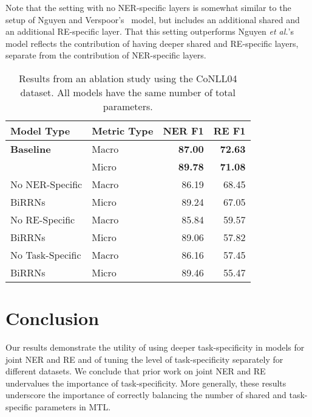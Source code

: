 \documentclass{article}
\begin{document}
Note that the setting with no NER-specific layers is somewhat similar to the setup of Nguyen and Verspoor's~ model, but includes an additional shared and an additional RE-specific layer. That this setting outperforms Nguyen {\em et al.}'s model reflects the contribution of having deeper shared and RE-specific layers, separate from the contribution of NER-specific layers.

\begin{table}[t]
\centering
\begin{tabular}{@{}llrr@{}}
\toprule
Model Type & Metric Type & NER F1 & RE F1\\ \midrule
\textbf{Baseline} & Macro & \textbf{87.00} & \textbf{72.63} \\ 
 & Micro & \textbf{89.78} & \textbf{71.08} \\ \midrule
No NER-Specific  & Macro & 86.19 & 68.45 \\
BiRRNs & Micro & 89.24 & 67.05 \\
No RE-Specific & Macro & 85.84 & 59.57  \\
BiRRNs & Micro & 89.06 & 57.82 \\
No Task-Specific & Macro & 86.16 & 57.45 \\
BiRRNs & Micro & 89.46 & 55.47 \\
\bottomrule
\end{tabular}
\caption{Results from an ablation study using the CoNLL04 dataset. All models have the same number of total parameters.}
\label{tab:ablation}
\end{table}

\section{Conclusion}

Our results demonstrate the utility of using deeper task-specificity in models for joint NER and RE and of tuning the level of task-specificity separately for different datasets. We conclude that prior work on joint NER and RE undervalues the importance of task-specificity. More generally, these results underscore the importance of correctly balancing the number of shared and task-specific parameters in MTL.
\end{document}
